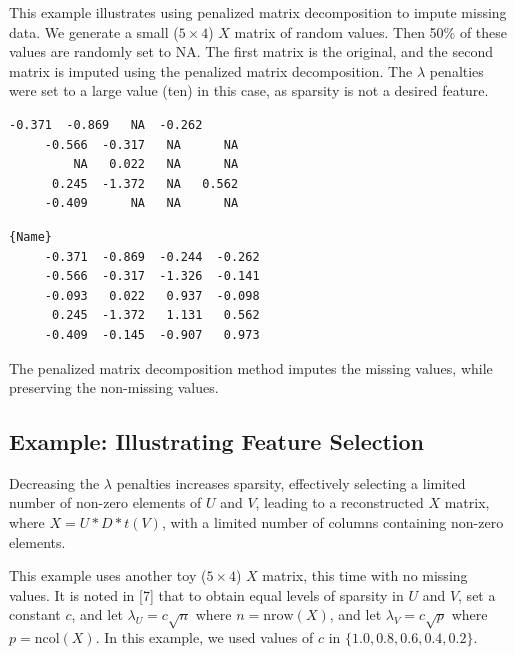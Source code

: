 \documentclass{article}
\begin{document}
This example illustrates using penalized matrix decomposition to impute missing data.  We generate a small ($5\times4$) $X$ matrix of random values.  Then 50\% of these values are randomly set to NA.  The first matrix is the original, and the second matrix is imputed using the penalized matrix decomposition.  The $\lambda$ penalties were set to a large value (ten) in this case, as sparsity is not a desired feature.

\noindent\begin{minipage}{.48\textwidth}
\begin{lstlisting}[caption=Original Matrix,frame=tlrb,basicstyle=\tiny]
     -0.371  -0.869   NA  -0.262
     -0.566  -0.317   NA      NA
         NA   0.022   NA      NA
      0.245  -1.372   NA   0.562
     -0.409      NA   NA      NA
\end{lstlisting}
\end{minipage}\hfill
\begin{minipage}{.48\textwidth}
\begin{lstlisting}[caption=Imputed Matrix,frame=tlrb,basicstyle=\tiny]{Name}
     -0.371  -0.869  -0.244  -0.262
     -0.566  -0.317  -1.326  -0.141
     -0.093   0.022   0.937  -0.098
      0.245  -1.372   1.131   0.562
     -0.409  -0.145  -0.907   0.973
\end{lstlisting}
\end{minipage}

The penalized matrix decomposition method imputes the missing values, while preserving the non-missing values.\\

\subsection{Example: Illustrating Feature Selection}

Decreasing the $\lambda$ penalties increases sparsity, effectively selecting a limited number of non-zero elements of $U$ and $V$, leading to a reconstructed $X$ matrix, where $X = U*D*t(V)$, with a limited number of columns containing non-zero elements.

This example uses another toy ($5\times4$) $X$ matrix, this time with no missing values.  It is noted in [7] that to obtain equal levels of sparsity in $U$ and $V$, set a constant $c$, and let $\lambda_U = c\sqrt{n}$ where $n = \text{nrow}(X)$, and let $\lambda_V = c\sqrt{p}$ where $p = \text{ncol}(X)$.  In this example, we used values of $c$ in $\{1.0, 0.8, 0.6, 0.4, 0.2\}$.
\end{document}
